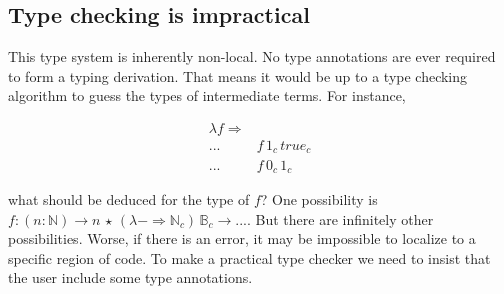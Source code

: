 




\subsection{Type checking is impractical}

This type system is inherently non-local.
No type annotations are ever required to form a typing derivation.
That means it would be up to a type checking algorithm to guess the types of intermediate terms.
For instance, 

\begin{align*}
\lambda f\Rightarrow & \,\\
... & f\,1_{c}\,true_{c}\\
... & f\,0_{c}\,1_{c}
\end{align*}
  
what should be deduced for the type of $f$? One possibility is $f:\left(n:\mathbb{N}\right)\rightarrow n\,\star\,\left(\lambda-\Rightarrow\mathbb{N}_{c}\right)\,\mathbb{B}_{c}\rightarrow...$.
But there are infinitely other possibilities.
Worse, if there is an error, it may be impossible to localize to a specific region of code.
To make a practical type checker we need to insist that the user include some type annotations.

